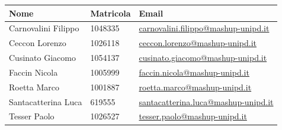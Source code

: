 \documentclass[10pt,a4paper,sans]{moderncv}        %
\begin{document}
	\begin{center}
		\begin{tabularx}{0.8\linewidth}{|X |X |l|}
		\hline
		\hspace*{0.2cm} \textbf{Nome} & \hspace*{0.2cm} \textbf{Matricola} & \hspace*{0.2cm} \textbf{Email} \\ \hline

		\hspace*{0.2cm} Carnovalini Filippo & \hspace*{0.2cm}1048335 & \hspace*{0.2cm}\href{mailto:carnovalini.filippo@mashup-unipd.it}{carnovalini.filippo@mashup-unipd.it} \\ \hline

		\hspace*{0.2cm} Ceccon Lorenzo & \hspace*{0.2cm}1026118 & \hspace*{0.2cm}\href{mailto:ceccon.lorenzo@mashup-unipd.it}{ceccon.lorenzo@mashup-unipd.it} \\ \hline

		\hspace*{0.2cm} Cusinato Giacomo &\hspace*{0.2cm}1054137 & \hspace*{0.2cm}\href{mailto:cusinato.giacomo@mashup-unipd.it}{cusinato.giacomo@mashup-unipd.it} \\ \hline

		\hspace*{0.2cm} Faccin Nicola &\hspace*{0.2cm}1005999  & \hspace*{0.2cm}\href{mailto:faccin.nicola@mashup-unipd.it}{faccin.nicola@mashup-unipd.it} \\ \hline

		\hspace*{0.2cm} Roetta Marco & \hspace*{0.2cm}1001887 & \hspace*{0.2cm}\href{mailto:roetta.marco@mashup-unipd.it}{roetta.marco@mashup-unipd.it} \\ \hline

		\hspace*{0.2cm} Santacatterina Luca & \hspace*{0.2cm}619555 & \hspace*{0.2cm}\href{mailto:santacatterina.luca@mashup-unipd.it}{santacatterina.luca@mashup-unipd.it} \\ \hline

		\hspace*{0.2cm} Tesser Paolo & \hspace*{0.2cm}1026527 & \hspace*{0.2cm}\href{mailto:tesser.paolo@mashup-unipd.it}{tesser.paolo@mashup-unipd.it} \\
		\hline
		\end{tabularx}
	\end{center}
\end{document}
